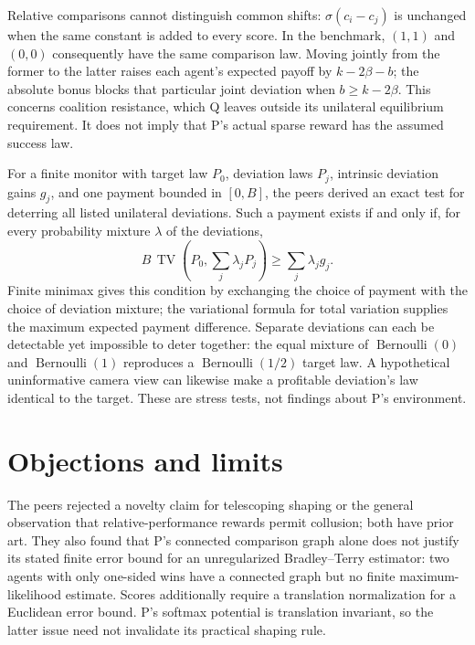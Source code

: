 \documentclass{article}
\begin{document}
Relative comparisons cannot distinguish common shifts: \(\sigma(c_i-c_j)\) is unchanged when the same constant is added to every score. In the benchmark, \((1,1)\) and \((0,0)\) consequently have the same comparison law. Moving jointly from the former to the latter raises each agent's expected payoff by \(k-2\beta-b\); the absolute bonus blocks that particular joint deviation when \(b\geq k-2\beta\). This concerns coalition resistance, which Q leaves outside its unilateral equilibrium requirement. It does not imply that P's actual sparse reward has the assumed success law. 

For a finite monitor with target law \(P_0\), deviation laws \(P_j\), intrinsic deviation gains \(g_j\), and one payment bounded in \([0,B]\), the peers derived an exact test for deterring all listed unilateral deviations. Such a payment exists if and only if, for every probability mixture \(\lambda\) of the deviations,
\[
B\,\operatorname{TV}\!\left(P_0,\sum_j\lambda_jP_j\right)
\geq \sum_j\lambda_jg_j.
\]
Finite minimax gives this condition by exchanging the choice of payment with the choice of deviation mixture; the variational formula for total variation supplies the maximum expected payment difference. Separate deviations can each be detectable yet impossible to deter together: the equal mixture of \(\operatorname{Bernoulli}(0)\) and \(\operatorname{Bernoulli}(1)\) reproduces a \(\operatorname{Bernoulli}(1/2)\) target law. A hypothetical uninformative camera view can likewise make a profitable deviation's law identical to the target. These are stress tests, not findings about P's environment. 

\section*{Objections and limits}

The peers rejected a novelty claim for telescoping shaping or the general observation that relative-performance rewards permit collusion; both have prior art. They also found that P's connected comparison graph alone does not justify its stated finite error bound for an unregularized Bradley--Terry estimator: two agents with only one-sided wins have a connected graph but no finite maximum-likelihood estimate. Scores additionally require a translation normalization for a Euclidean error bound. P's softmax potential is translation invariant, so the latter issue need not invalidate its practical shaping rule. 
\end{document}
